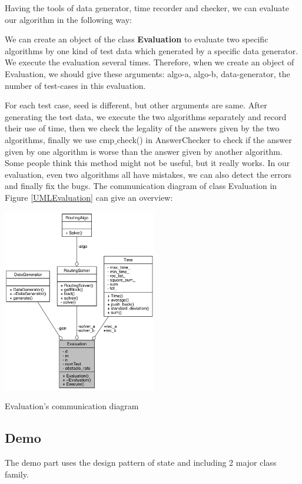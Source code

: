 \documentclass[twocolumn]{article}
\begin{document}
Having the tools of data generator, time recorder and checker, we can evaluate our algorithm in the following way:

We can create an object of the class \textbf{Evaluation} to evaluate two specific algorithms by one kind of test data which generated by a specific data generator. We execute the evaluation several times. Therefore, when we create an object of Evaluation, we should give these arguments: algo-a, algo-b, data-generator, the number of test-cases in this evaluation.

For each test case, seed is different, but other arguments are same. After generating the test data, we execute the two algorithms separately and record their use of time, then we check the legality of the answers given by the two algorithms, finally we use cmp$\_$check() in AnswerChecker to check if the answer given by one algorithm is worse than the answer given by another algorithm. Some people think this method might not be useful, but it really works. In our evaluation, even two algorithms all have mistakes, we can also detect the errors and finally fix the bugs. The communication diagram of class Evaluation in Figure \ref{UMLEvaluation} can give an overview:

\begin{center}
\makeatletter
\def\@captype{figure}
\makeatother
\includegraphics [height=8cm]{UMLEvaluation}
\caption{Evaluation's communication diagram}
\label{UMLEvaluation}
\end{center}

\subsection{Demo}

The demo part uses the design pattern of state and including 2 major class family.
\end{document}
